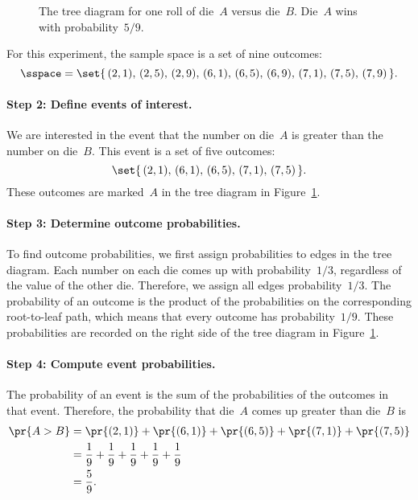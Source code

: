 \begin{figure}


\caption{The tree diagram for one roll of die~$A$ versus die~$B$.
  Die~$A$ wins with probability~$5/9$.}

\label{fig:14A8}

\end{figure}

For this experiment, the sample space is a set of nine outcomes:
\begin{equation*}
\sspace = \set{\, (2, 1), \, (2, 5), \, (2, 9), \,
                  (6, 1), \, (6, 5), \, (6, 9), \,
                  (7, 1), \, (7, 5), \, (7, 9) \,}.
\end{equation*}

\paragraph{Step 2: Define events of interest.}

We are interested in the event that the number on die~$A$ is greater
than the number on die~$B$.  This event is a set of five outcomes:
\begin{equation*}
    \set{\, (2, 1), \, (6, 1), \, (6, 5), \, (7, 1), \, (7, 5) \,}.
\end{equation*}
These outcomes are marked~$A$ in the tree diagram in
Figure~\ref{fig:14A8}.

\paragraph{Step 3: Determine outcome probabilities.}

To find outcome probabilities, we first assign probabilities to edges
in the tree diagram.  Each number on each die comes up with
probability~$1/3$, regardless of the value of the other die.
Therefore, we assign all edges probability~$1/3$.  The probability of
an outcome is the product of the probabilities on the corresponding
root-to-leaf path, which means that every outcome has
probability~$1/9$.  These probabilities are recorded on the right side
of the tree diagram in Figure~\ref{fig:14A8}.

\paragraph{Step 4: Compute event probabilities.}

The probability of an event is the sum of the probabilities of the
outcomes in that event.  Therefore, the probability that die~$A$ comes
up greater than die~$B$ is
\begin{align*}
\pr{A > B}
    &= \pr{(2, 1)} + \pr{(6, 1)} + \pr{(6, 5)} + \pr{(7, 1)} + \pr{(7, 5)} \\
    &= \frac{1}{9} + \frac{1}{9} + \frac{1}{9} + \frac{1}{9} + \frac{1}{9} \\
    &= \frac{5}{9}.
\end{align*}

